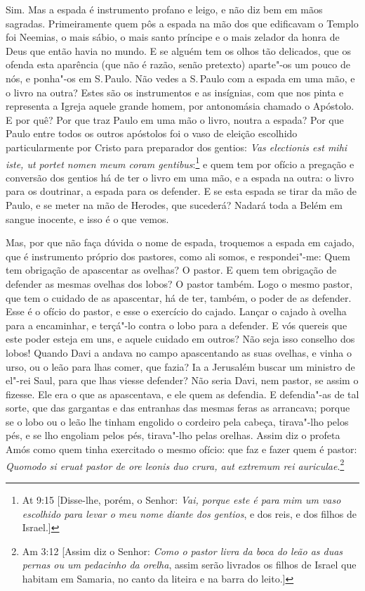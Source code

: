 Sim. Mas a espada é instrumento profano e leigo, e não diz bem em mãos
sagradas. Primeiramente quem pôs a espada na mão dos que edificavam o
Templo foi Neemias, o mais sábio, o mais santo príncipe e o mais zelador
da honra de Deus que então havia no mundo. E se alguém tem os olhos tão
delicados, que os ofenda esta aparência (que não é razão, senão
pretexto) aparte"-os um pouco de nós, e ponha"-os em S.\,Paulo. Não vedes
a S.\,Paulo com a espada em uma mão, e o livro na outra? Estes são os
instrumentos e as insígnias, com que nos pinta e representa a Igreja
aquele grande homem, por antonomásia chamado o Apóstolo. E por quê? Por
que traz Paulo em uma mão o livro, noutra a espada? Por que Paulo entre
todos os outros apóstolos foi o vaso de eleição escolhido
particularmente por Cristo para preparador dos gentios: \emph{Vas
electionis est mihi iste, ut portet nomen meum coram gentibus}:\footnote{At 9:15 [Disse-lhe, porém, o Senhor: \emph{Vai, porque este é para mim um vaso escolhido para levar o meu nome diante dos gentios}, e dos reis, e dos filhos de Israel.]} e quem tem por ofício a pregação e conversão dos gentios há de
ter o livro em uma mão, e a espada na outra: o livro para os doutrinar,
a espada para os defender. E se esta espada se tirar da mão de Paulo, e
se meter na mão de Herodes, que sucederá? Nadará toda a Belém em sangue
inocente, e isso é o que vemos.

Mas, por que não faça dúvida o nome de espada, troquemos a espada em
cajado, que é instrumento próprio dos pastores, como ali somos, e
respondei"-me: Quem tem obrigação de apascentar as ovelhas? O pastor. E
quem tem obrigação de defender as mesmas ovelhas dos lobos? O pastor
também. Logo o mesmo pastor, que tem o cuidado de as apascentar, há de
ter, também, o poder de as defender. Esse é o ofício do pastor, e esse o
exercício do cajado. Lançar o cajado à ovelha para a encaminhar, e
terçá"-lo contra o lobo para a defender. E vós quereis que este poder
esteja em uns, e aquele cuidado em outros? Não seja isso conselho dos
lobos! Quando Davi a andava no campo apascentando as suas ovelhas, e
vinha o urso, ou o leão para lhas comer, que fazia? Ia a Jerusalém
buscar um ministro de el"-rei Saul, para que lhas viesse defender? Não
seria Davi, nem pastor, se assim o fizesse. Ele era o que as
apascentava, e ele quem as defendia. E defendia"-as de tal sorte, que das
gargantas e das entranhas das mesmas feras as arrancava; porque se o
lobo ou o leão lhe tinham engolido o cordeiro pela cabeça, tirava"-lho
pelos pés, e se lho engoliam pelos pés, tirava"-lho pelas orelhas.
Assim diz o profeta Amós como quem tinha exercitado o mesmo ofício:
que faz e fazer quem é pastor: \emph{Quomodo si eruat pastor de ore
leonis duo crura, aut extremum rei auriculae}.\footnote{Am 3:12 [Assim diz o Senhor: \emph{Como o pastor livra da boca do leão as duas pernas ou um pedacinho
da orelha}, assim serão livrados os filhos de Israel que habitam em Samaria, no canto da liteira e na barra do leito.]}

